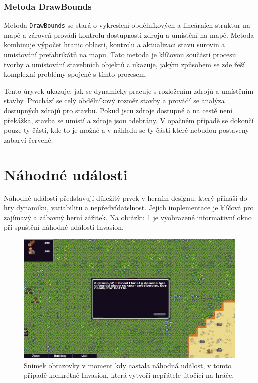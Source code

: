 \subsubsection{Metoda DrawBounds}
Metoda \texttt{DrawBounds} se stará o vykreslení obdélníkových a lineárních struktur na mapě a zároveň provádí kontrolu dostupnosti zdrojů a umístění na mapě. Metoda kombinuje výpočet hranic oblasti, kontrolu a aktualizaci stavu surovin a umisťování prefabrikátů na mapu. Tato metoda je klíčovou součástí procesu tvorby a umísťování stavebních objektů a ukazuje, jakým způsobem se zde řeší komplexní problémy spojené s tímto procesem.

Tento úryvek ukazuje, jak se dynamicky pracuje s rozložením zdrojů a umístěním stavby. Prochází se celý obdélníkový rozměr stavby a provádí se analýza dostupných zdrojů pro stavbu. Pokud jsou zdroje dostupné a na cestě není překážka, stavba se umístí a zdroje jsou odebrány. V opačném případě se dokončí pouze ty části, kde to je možné a v náhledu se ty části které nebudou postaveny zabarví červeně.

\section{Náhodné události}
Náhodné události představují důležitý prvek v herním designu, který přináší do hry dynamiku, variabilitu a nepředvídatelnost. Jejich implementace je klíčová pro zajímavý a zábavný herní zážitek. Na obrázku \ref{RandomEvent} je vyobrazené informativní okno při spuštění náhodné události Invasion.

\begin{figure}[H]
	\centering
	\includegraphics[scale=0.55]{obrazky-figures/RandomEventPicture.png}
	\caption{Snímek obrazovky v moment kdy nastala náhodná událost, v tomto případě konkrétně Invasion, která vytvoří nepřátele útočící na hráče.}
	\label{RandomEvent}
\end{figure}

